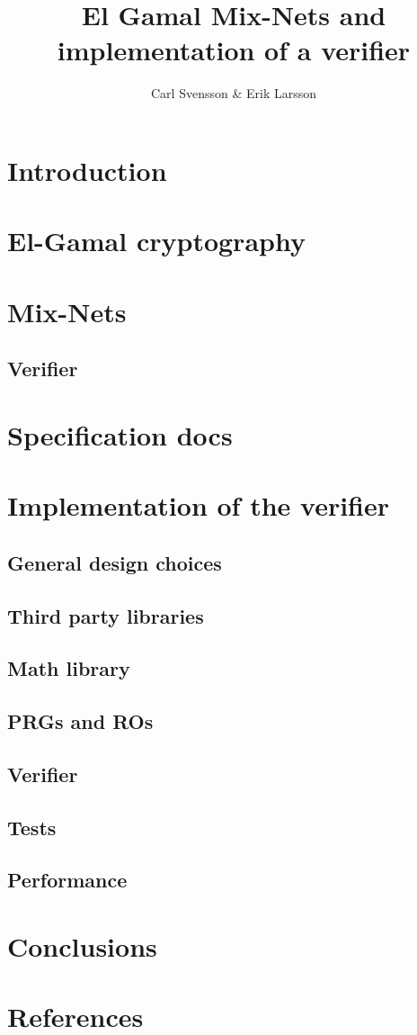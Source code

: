 \documentclass[10pt,a4paper]{article}
\author{Carl Svensson \& Erik Larsson}
\title{El Gamal Mix-Nets and implementation of a verifier}
\begin{document}
\maketitle
\tableofcontents

\section{Introduction}

\section{El-Gamal cryptography}

\section{Mix-Nets}

\subsection{Verifier}

\section{Specification docs}

\section{Implementation of the verifier}

\subsection{General design choices}

\subsection{Third party libraries}

\subsection{Math library}

\subsection{PRGs and ROs}

\subsection{Verifier}

\subsection{Tests}

\subsection{Performance}

\section{Conclusions}

\section{References}
\end{document}
